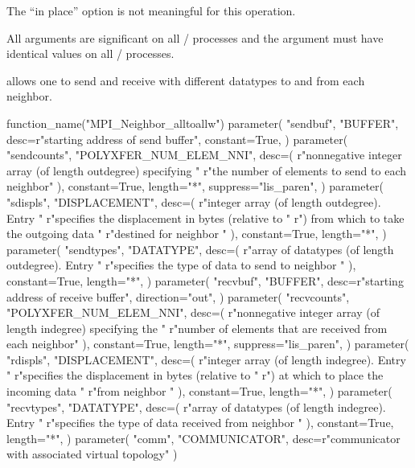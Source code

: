 The ``in place'' option is not meaningful for this operation.

All arguments are significant on all \MPI/ processes and the argument
 must have identical values on all \MPI/ processes.


 allows one to send and receive with
different datatypes to and from each neighbor.

\begin{mpi-binding}
    function_name("MPI_Neighbor_alltoallw")
    parameter(
        "sendbuf",
        "BUFFER",
        desc=r"starting address of send buffer",
        constant=True,
    )
    parameter(
        "sendcounts",
        "POLYXFER_NUM_ELEM_NNI",
        desc=(
            r"nonnegative integer array (of length outdegree) specifying "
            r"the number of elements to send to each neighbor"
        ),
        constant=True,
        length="*",
        suppress="lis_paren",
    )
    parameter(
        "sdispls",
        "DISPLACEMENT",
        desc=(
            r"integer array (of length outdegree). Entry  "
            r"specifies the displacement in bytes (relative to "
            r") from which to take the outgoing data "
            r"destined for neighbor "
        ),
        constant=True,
        length="*",
    )
    parameter(
        "sendtypes",
        "DATATYPE",
        desc=(
            r"array of datatypes (of length outdegree). Entry  "
            r"specifies the type of data to send to neighbor "
        ),
        constant=True,
        length="*",
    )
    parameter(
        "recvbuf",
        "BUFFER",
        desc=r"starting address of receive buffer",
        direction="out",
    )
    parameter(
        "recvcounts",
        "POLYXFER_NUM_ELEM_NNI",
        desc=(
            r"nonnegative integer array (of length indegree) specifying the "
            r"number of elements that are received from each neighbor"
        ),
        constant=True,
        length="*",
        suppress="lis_paren",
    )
    parameter(
        "rdispls",
        "DISPLACEMENT",
        desc=(
            r"integer array (of length indegree). Entry  "
            r"specifies the displacement in bytes (relative to "
            r") at which to place the incoming data "
            r"from neighbor "
        ),
        constant=True,
        length="*",
    )
    parameter(
        "recvtypes",
        "DATATYPE",
        desc=(
            r"array of datatypes (of length indegree). Entry  "
            r"specifies the type of data received from neighbor "
        ),
        constant=True,
        length="*",
    )
    parameter(
        "comm", "COMMUNICATOR", desc=r"communicator with associated virtual topology"
    )
\end{mpi-binding}


